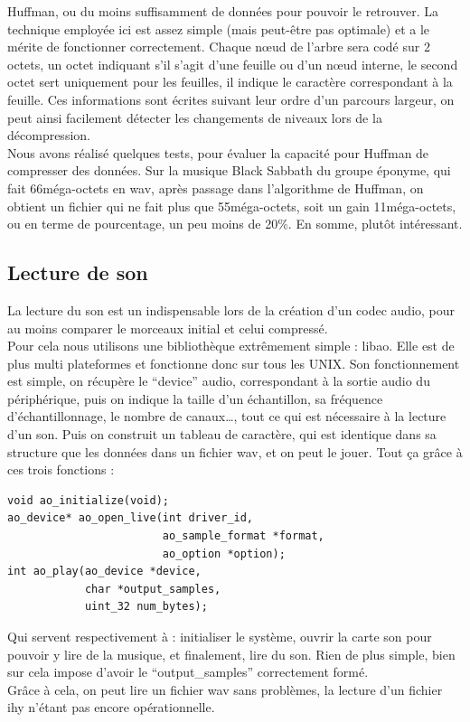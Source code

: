 \documentclass[a4paper,12pt]{article}
\begin{document}
Huffman, ou du moins suffisamment de données pour pouvoir le retrouver. La
technique employée ici est assez simple (mais peut-être pas optimale) et a le
mérite de fonctionner correctement. Chaque nœud de l'arbre sera codé sur 2 octets, un octet
indiquant s'il s'agit d'une feuille ou d'un nœud interne, le second octet sert
uniquement pour les feuilles, il indique le caractère correspondant à la
feuille. Ces informations sont écrites suivant leur ordre d'un parcours largeur,
on peut ainsi facilement détecter les changements de niveaux lors de la
décompression.\\
Nous avons réalisé quelques tests, pour évaluer la capacité pour Huffman de
compresser des données. Sur la musique Black Sabbath du groupe éponyme, qui fait
66méga-octets en wav, après passage dans l'algorithme de Huffman, on obtient un
fichier qui ne
fait plus que 55méga-octets, soit un gain 11méga-octets, ou en terme de pourcentage, un
peu moins de 20\%. En somme, plutôt intéressant.\\

	\subsection{Lecture de son}
La lecture du son est un indispensable lors de la création d'un codec audio, pour
au moins comparer le morceaux initial et celui compressé.\\ Pour cela nous
utilisons une bibliothèque extrêmement simple : libao.  Elle est de plus multi
plateformes et fonctionne donc sur tous les UNIX.  Son fonctionnement est
simple, on récupère le ``device'' audio, correspondant à la sortie audio du
périphérique, puis on indique la taille d'un échantillon, sa fréquence
d'échantillonnage, le nombre de canaux\ldots, tout ce qui est nécessaire à la
lecture d'un son. Puis on construit un tableau de caractère, qui est identique
dans sa structure que les données dans un fichier wav, et on peut le jouer. Tout
ça grâce à ces trois fonctions :
\begin{verbatim}
void ao_initialize(void);
ao_device* ao_open_live(int driver_id,
                        ao_sample_format *format,
                        ao_option *option);
int ao_play(ao_device *device,
            char *output_samples,
            uint_32 num_bytes);
\end{verbatim}
Qui servent respectivement à : initialiser le système, ouvrir la carte son pour
pouvoir y lire de la musique, et finalement, lire du son. Rien de plus simple,
bien sur cela impose d'avoir le ``output\_samples'' correctement formé.\\
Grâce à cela, on peut lire un fichier wav sans problèmes, la lecture d'un
fichier ihy n'étant pas encore opérationnelle.\\
\end{document}
